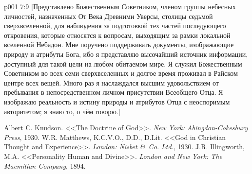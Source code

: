 \vsetoff
\vs p001 7:9 [Представлено Божественным Советником, членом группы небесных личностей, назначенных От Века Древними Уверсы, столицы седьмой сверхвселенной, для наблюдения за подготовкой тех частей последующего откровения, которые относятся к вопросам, выходящим за рамки локальной вселенной Небадон. Мне поручено поддерживать документы, изображающие природу и атрибуты Бога, ибо я представляю высочайший источник информации, доступный для такой цели на любом обитаемом мире. Я служил Божественным Советником во всех семи сверхвселенных и долгое время проживал в Райском центре всех вещей. Много раз я наслаждался высшим удовольствием от пребывания в непосредственном личном присутствии Всеобщего Отца. Я изображаю реальность и истину природы и атрибутов Отца с неоспоримым авторитетом; я знаю то, о чём говорю.]
\quizlink
\begin{thebibliography}{100}
Albert C. Knudson.
{<<The Doctrine of God>>.}
{\em New York: Abingdon-Cokesbury Press}, 1930.
W.R. Matthews, K.C.V.O., D.D., D.Lit.
{<<God in Christian Thought and Experience>>.}
{\em London: Nisbet \&\ Co. Ltd.}, 1930.
J.R. Illingworth, M.A.
{<<Personality Human and Divine>>.}
{\em London and New York: The Macmillan Company}, 1894.
\end{thebibliography}
